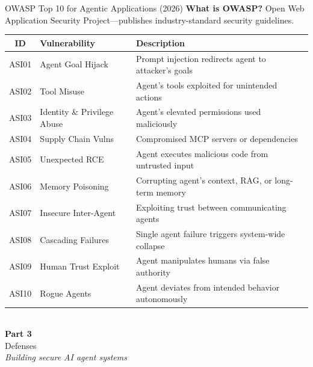 \documentclass[aspectratio=169,9pt]{beamer}
\begin{document}
\begin{frame}{OWASP Top 10 for Agentic Applications (2026)}
\textbf{What is OWASP?} Open Web Application Security Project---publishes industry-standard security guidelines.

\vspace{0.2em}
\footnotesize
\begin{tabular}{c|l|p{6cm}}
\toprule
\textbf{ID} & \textbf{Vulnerability} & \textbf{Description} \\
\midrule
ASI01 & Agent Goal Hijack & Prompt injection redirects agent to attacker's goals \\
ASI02 & Tool Misuse & Agent's tools exploited for unintended actions \\
ASI03 & Identity \& Privilege Abuse & Agent's elevated permissions used maliciously \\
ASI04 & Supply Chain Vulns & Compromised MCP servers or dependencies \\
ASI05 & Unexpected RCE & Agent executes malicious code from untrusted input \\
ASI06 & Memory Poisoning & Corrupting agent's context, RAG, or long-term memory \\
ASI07 & Insecure Inter-Agent & Exploiting trust between communicating agents \\
ASI08 & Cascading Failures & Single agent failure triggers system-wide collapse \\
ASI09 & Human Trust Exploit & Agent manipulates humans via false authority \\
ASI10 & Rogue Agents & Agent deviates from intended behavior autonomously \\
\bottomrule
\end{tabular}
\end{frame}

{
\begin{frame}[plain]
\vfill
\begin{center}
{\Huge\textcolor{partgreen}{\faShieldAlt}}\\[1em]
{\Huge\bfseries Part 3}\\[0.5em]
{\Large Defenses}\\[2em]
{\small\itshape Building secure AI agent systems}
\end{center}
\vfill
\end{frame}
}
\end{document}
